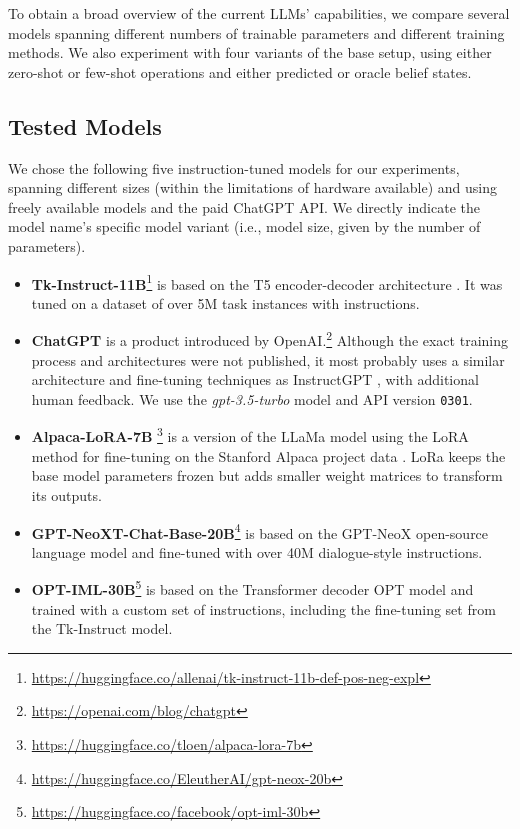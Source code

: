 To obtain a broad overview of the current LLMs' capabilities, we compare several models spanning different numbers of trainable parameters and different training methods. 
We also experiment with four variants of the base setup, using either zero-shot or few-shot operations and either predicted or oracle belief states.

\subsection{Tested Models}
We chose the following five instruction-tuned models for our experiments, spanning different sizes (within the limitations of hardware available) and using freely available models and the paid ChatGPT API.
We directly indicate the model name's specific model variant (i.e., model size, given by the number of parameters).
\label{07:sec:par:models}
\begin{itemize}
    \item \textbf{Tk-Instruct-11B}\footnote{\url{https://huggingface.co/allenai/tk-instruct-11b-def-pos-neg-expl}} \cite{supernaturalinstructions} is based on the T5 encoder-decoder architecture \cite{2020t5}. It was tuned on a dataset of over 5M task instances with instructions.
    \item \textbf{ChatGPT} is a product introduced by OpenAI.\footnote{\url{https://openai.com/blog/chatgpt}} Although the exact training process and architectures were not published, it most probably uses a similar architecture and fine-tuning techniques as InstructGPT \cite{ouyang2022training}, with additional human feedback.
    We use the \emph{gpt-3.5-turbo} model and API version \texttt{0301}.
    \item \textbf{Alpaca-LoRA-7B} \footnote{\url{https://huggingface.co/tloen/alpaca-lora-7b}} is a version of the LLaMa model \cite{touvron2023llama} using the LoRA method \cite{hu2021lora} for fine-tuning on the Stanford Alpaca project data \cite{alpaca}. LoRa keeps the base model parameters frozen but adds smaller weight matrices to transform its outputs.
    \item \textbf{GPT-NeoXT-Chat-Base-20B}\footnote{\url{https://huggingface.co/EleutherAI/gpt-neox-20b}} is based on the GPT-NeoX open-source language model \cite{black2022gpt} and fine-tuned with over 40M dialogue-style instructions.
    \item \textbf{OPT-IML-30B}\footnote{\url{https://huggingface.co/facebook/opt-iml-30b}} \cite{iyer2022opt} is based on the Transformer decoder OPT model \cite{zhang2022opt} and trained with a custom set of instructions, including the fine-tuning set from the Tk-Instruct model.
\end{itemize}

